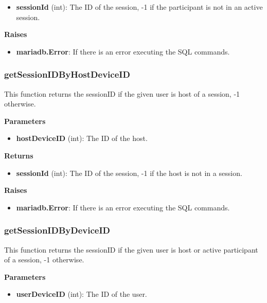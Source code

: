\documentclass[oneside, nenglish]{sdqtechreport}
\begin{document}
\begin{itemize}
\begin{itemize}
    \item \textbf{sessionId} (int): The ID of the session, -1 if the participant is not in an active session.
\end{itemize}

\textbf{Raises}

\begin{itemize}
    \item \textbf{mariadb.Error}: If there is an error executing the SQL commands.
\end{itemize}

\subsubsection{getSessionIDByHostDeviceID}

This function returns the sessionID if the given user is host of a session, -1 otherwise.

\textbf{Parameters}

\begin{itemize}
    \item \textbf{hostDeviceID} (int): The ID of the host.
\end{itemize}

\textbf{Returns}

\begin{itemize}
    \item \textbf{sessionId} (int): The ID of the session, -1 if the host is not in a session.
\end{itemize}

\textbf{Raises}

\begin{itemize}
    \item \textbf{mariadb.Error}: If there is an error executing the SQL commands.
\end{itemize}

\subsubsection{getSessionIDByDeviceID}

This function returns the sessionID if the given user is host or active participant of a session, -1 otherwise.

\textbf{Parameters}

\begin{itemize}
    \item \textbf{userDeviceID} (int): The ID of the user.
\end{itemize}


\end{itemize}
\end{document}
